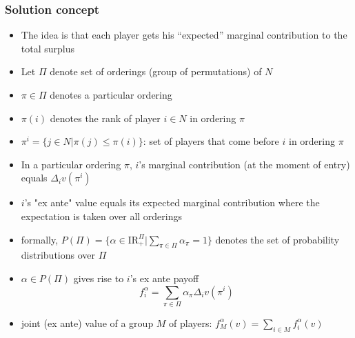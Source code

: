 \documentclass[11pt,english]{beamer}
\newcommand{\re}{\mbox{I}\!\mbox{R}}
\begin{document}
\begin{frame}[allowframebreaks]\frametitle{Solution concept}
  \begin{itemize}
  \item The idea is that each player gets his ``expected'' marginal
    contribution to the total surplus
  \item Let $\Pi$ denote set of orderings (group of permutations) of $N$
  \item $\pi \in \Pi$ denotes a particular ordering
  \item $\pi(i)$ denotes the rank of player $i \in N$ in ordering $\pi$
  \item $\pi^i = \{j \in N | \pi(j) \leq \pi(i) \}$: set of players
    that come before $i$ in ordering $\pi$
  \item In a particular ordering $\pi$, $i$'s marginal contribution
    (at the moment of entry) equals $\Delta_i v(\pi^i)$
  \item $i$'s "ex ante" value equals its expected marginal
    contribution where the expectation is taken over all orderings
  \item formally, $P(\Pi) = \{ \alpha \in \re^{\Pi}_+ | \sum_{\pi \in
      \Pi} \alpha_{\pi} =1 \}$ denotes the set of probability
    distributions over $\Pi$
  \item $\alpha \in P(\Pi)$ gives rise to $i$'s ex ante payoff
    \begin{equation*}
      f_i^{\alpha} = \sum_{\pi \in \Pi} \alpha_{\pi} \Delta_i v(\pi^i)
    \end{equation*}
  \item joint (ex ante) value of a group $M$ of players:
    $f_M^{\alpha}(v) = \sum_{i \in M} f_i^{\alpha} (v)$
  \end{itemize} %
\end{frame}
\end{document}
